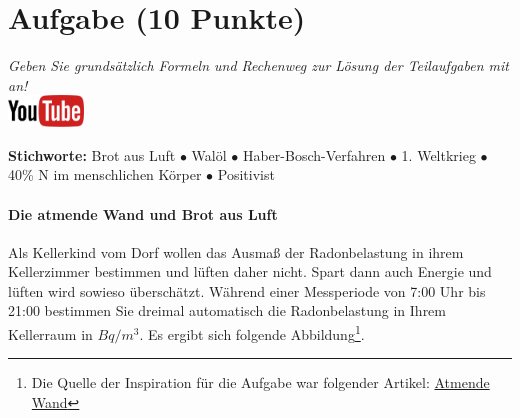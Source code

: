 \documentclass[a4paper, 9pt]{scrartcl}\usepackage[]{graphicx}\usepackage[]{xcolor}
\begin{document}
 
\clearpage

\section{Aufgabe \hfill (10 Punkte)}

\textit{Geben Sie grundsätzlich Formeln und Rechenweg zur L{\"o}sung der
  Teilaufgaben mit an!} \\[1Ex]

\hfill\href{https://youtu.be/4-dSaPMhK9s}{\includegraphics[width =
  2cm]{img/youtube}} %
\hspace{2Ex}

{\tiny\textbf{Stichworte:} Brot aus Luft $\bullet$ Walöl $\bullet$ Haber-Bosch-Verfahren $\bullet$ 1. Weltkrieg $\bullet$ 40\% N im menschlichen Körper $\bullet$ Positivist}

\paragraph{Die atmende Wand und Brot aus Luft}



Als Kellerkind vom Dorf wollen das Ausmaß der Radonbelastung in ihrem Kellerzimmer bestimmen und
lüften daher nicht. Spart dann auch Energie und lüften wird sowieso überschätzt. Während einer Messperiode von 7:00 Uhr bis
21:00 bestimmen Sie dreimal automatisch die Radonbelastung in
Ihrem Kellerraum in $Bq/m^3$. Es ergibt sich folgende Abbildung\footnote{Die Quelle der Inspiration
  für die Aufgabe war folgender Artikel:
  \href{https://de.wikipedia.org/wiki/Atmende_Wand}{Atmende Wand}}.
\end{document}
